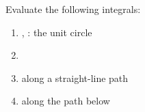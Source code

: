 \begin{EMexercise}{}

Evaluate the following integrals:

\begin{enumerate}
\def\labelenumi{\arabic{enumi}.}
\tightlist
\item
  , : the unit circle
\item
\item
   along a straight-line path
\item
   along the path below
\end{enumerate}

\end{EMexercise}

\begin{EMunit}


\end{EMunit}
